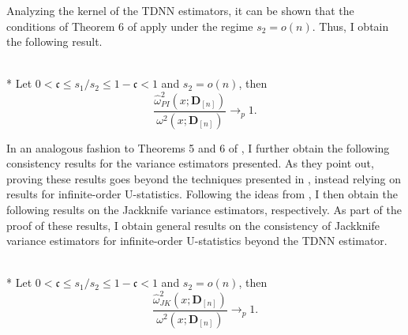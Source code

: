 Analyzing the kernel of the TDNN estimators, it can be shown that the conditions of Theorem 6 of \citet{peng_bias_2021} apply under the regime $s_2 = o(n)$.
Thus, I obtain the following result.
	
\begin{boxD}
	\begin{thm}\label{thm:PI_JK_Cons}\mbox{}\\*
		Let $0 < \mathfrak{c} \leq s_1/s_2 \leq 1 - \mathfrak{c} < 1$ and $s_2 = o(n)$, then
		\begin{equation}
			\frac{\hat{\omega}_{PI}^2\left(x; \mathbf{D}_{[n]}\right)}{\omega^{2}\left(x; \mathbf{D}_{[n]}\right)} \longrightarrow_{p} 1.
		\end{equation}
	\end{thm}
\end{boxD}


In an analogous fashion to Theorems 5 and 6 of \citet{demirkaya_optimal_2024}, I further obtain the following consistency results for the variance estimators presented.
As they point out, proving these results goes beyond the techniques presented in \citet{arvesen_jackknifing_1969}, instead relying on results for infinite-order U-statistics.
Following the ideas from \citet{peng_bias_2021}, I then obtain the following results on the Jackknife variance estimators, respectively.
As part of the proof of these results, I obtain general results on the consistency of Jackknife variance estimators for infinite-order U-statistics beyond the TDNN estimator.
\begin{boxD}
	\begin{thm}\label{thm:JK_Cons}\mbox{}\\*
		Let $0 < \mathfrak{c} \leq s_1/s_2 \leq 1 - \mathfrak{c} < 1$ and $s_2 = o(n)$, then
		\begin{equation}
			\frac{\hat{\omega}_{JK}^2\left(x; \mathbf{D}_{[n]}\right)}{\omega^{2}\left(x; \mathbf{D}_{[n]}\right)} \longrightarrow_{p} 1.
		\end{equation}
	\end{thm}
\end{boxD}

